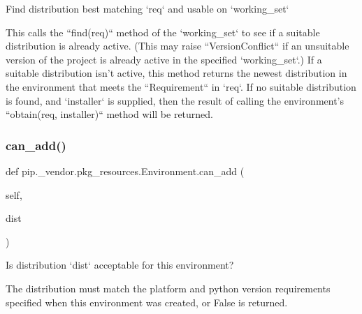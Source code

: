 \begin{DoxyVerb}Find distribution best matching `req` and usable on `working_set`

This calls the ``find(req)`` method of the `working_set` to see if a
suitable distribution is already active.  (This may raise
``VersionConflict`` if an unsuitable version of the project is already
active in the specified `working_set`.)  If a suitable distribution
isn't active, this method returns the newest distribution in the
environment that meets the ``Requirement`` in `req`.  If no suitable
distribution is found, and `installer` is supplied, then the result of
calling the environment's ``obtain(req, installer)`` method will be
returned.
\end{DoxyVerb}
 \mbox{\label{classpip_1_1__vendor_1_1pkg__resources_1_1Environment_ada05f2e83376abee2592ec9571fce0af}} 
\subsubsection{\texorpdfstring{can\+\_\+add()}{can\_add()}}
{\footnotesize\ttfamily def pip.\+\_\+vendor.\+pkg\+\_\+resources.\+Environment.\+can\+\_\+add (\begin{DoxyParamCaption}\item[{}]{self,  }\item[{}]{dist }\end{DoxyParamCaption})}

\begin{DoxyVerb}Is distribution `dist` acceptable for this environment?

The distribution must match the platform and python version
requirements specified when this environment was created, or False
is returned.
\end{DoxyVerb}
 \mbox{\label{classpip_1_1__vendor_1_1pkg__resources_1_1Environment_a028e6fe4beeb40dd26ccc2bc5cf0b6e2}} 
